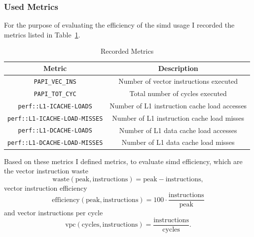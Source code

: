\documentclass[a4paper, 11pt]{memoir}
\begin{document}
    \subsubsection{Used Metrics}
    For the purpose of evaluating the efficiency of the \gls{simd} usage I recorded the metrics listed in Table~\ref{tab:metrics}.
    \begin{table}[b]
        \centering
        \begin{tabular}{|c|c|}
            \hline
            Metric & Description \\\hline
            \texttt{PAPI_VEC_INS} & Number of vector instructions executed\\
            \texttt{PAPI_TOT_CYC} & Total number of cycles executed\\
            \texttt{perf::L1-ICACHE-LOADS} & Number of L1 instruction cache load accesses\\
            \texttt{perf::L1-ICACHE-LOAD-MISSES} & Number of L1 instruction cache load misses\\
            \texttt{perf::L1-DCACHE-LOADS} & Number of L1 data cache load accesses\\
            \texttt{perf::L1-DCACHE-LOAD-MISSES} & Number of L1 data cache load misses\\
            \hline
        \end{tabular}
        \caption{Recorded Metrics}
        \label{tab:metrics}
    \end{table}

    Based on these metrics I defined metrics, to evaluate \gls{simd} efficiency, which are the vector instruction waste
    \begin{equation}
        \text{waste}(\text{peak}, \text{instructions}) = \text{peak} - \text{instructions},
        \label{eq:vec_waste}
    \end{equation}
    vector instruction efficiency
    \begin{equation}
        \text{efficiency}(\text{peak}, \text{instructions}) = 100 \cdot \frac{\text{instructions}}{\text{peak}}
        \label{eq:vec_efficiency}
    \end{equation}
    and vector instructions per cycle
    \begin{equation}
        \text{vpc}(\text{cycles}, \text{instructions}) = \frac{\text{instructions}}{\text{cycles}}.
        \label{eq:vpc}
    \end{equation}
\end{document}
